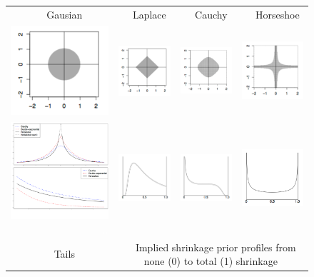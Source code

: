 \documentclass[xcolor={dvipsnames}]{beamer}
\begin{document}
{{\vspace{-.75em}

\begin{figure}
\centering
\begin{tabular}{rrrr}
\multicolumn{1}{c}{\tiny $\quad$Gausian} & \multicolumn{1}{c}{\tiny$\quad$Laplace} & \multicolumn{1}{c}{\tiny$\quad$Cauchy} & \multicolumn{1}{c}{\tiny$\quad$Horseshoe} \\
 \includegraphics[width=.7525in]{stuffs/regularization_prior3_R.png} &
 \includegraphics[width=.75in]{stuffs/regularization_prior3_L.png} &
  \includegraphics[width=.7525in]{stuffs/regularization_prior3_C.png} &
 \includegraphics[width=.75in]{stuffs/regularization_prior3_H.png} \\
 \includegraphics[width=.5525in]{stuffs/regularization_prior2.png}\textcolor{white}{\tiny ...}
 &
 \includegraphics[width=.65in]{stuffs/regularization_prior4_L.png} &
  \includegraphics[width=.65in]{stuffs/regularization_prior4_C.png} &
 \includegraphics[width=.65in]{stuffs/regularization_prior4_H.png} \\
\multicolumn{1}{c}{\tiny$\quad$Tails}& \multicolumn{3}{c}{\tiny $\quad$Implied shrinkage prior profiles from none (0) to total (1) shrinkage}
  \end{tabular}
\end{figure}
}
}
\end{document}
